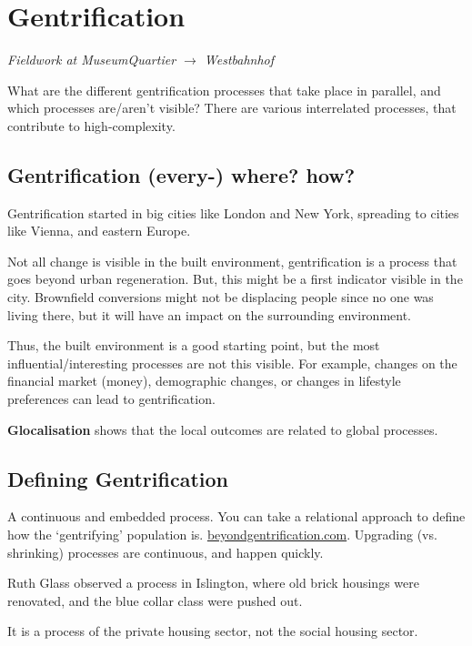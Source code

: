 \documentclass{article}
\begin{document}
\section{Gentrification}

\textit{Fieldwork at MuseumQuartier $\rightarrow$ Westbahnhof}

What are the different gentrification processes that take place in parallel, and which processes are/aren't visible? There are various interrelated processes, that contribute to high-complexity.

\subsection{Gentrification (every-) where? how?}

Gentrification started in big cities like London and New York, spreading to cities like Vienna, and eastern Europe. 

Not all change is visible in the built environment, gentrification is a process that goes beyond urban regeneration. But, this might be a first indicator visible in the city. Brownfield conversions might not be displacing people since no one was living there, but it will have an impact on the surrounding environment. 

Thus, the built environment is a good starting point, but the most influential/interesting processes are not this visible. For example, changes on the financial market (money), demographic changes, or changes in lifestyle preferences can lead to gentrification.

\textbf{Glocalisation} shows that the local outcomes are related to global processes.

\subsection{Defining Gentrification}

A continuous and embedded process. You can take a relational approach to define how the `gentrifying' population is. \url{beyondgentrification.com}. Upgrading (vs. shrinking) processes are continuous, and happen quickly.

Ruth Glass observed a process in Islington, where old brick housings were renovated, and the blue collar class were pushed out. 

It is a process of the private housing sector, not the social housing sector.
\end{document}
